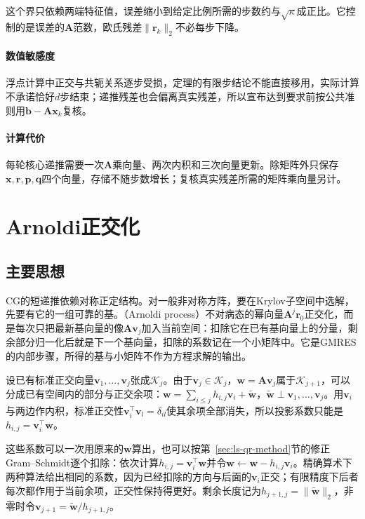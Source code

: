 这个界只依赖两端特征值，误差缩小到给定比例所需的步数约与$\sqrt\kappa$成正比。它控制的是误差的$\bm A$范数，欧氏残差$\lVert\bm r_k\rVert_2$不必每步下降。

\paragraph{数值敏感度}
浮点计算中正交与共轭关系逐步受损，定理的有限步结论不能直接移用，实际计算不承诺恰好$d$步结束；递推残差也会偏离真实残差，所以宣布达到要求前按公共准则用$\bm b-\bm A\bm x_k$复核。

\paragraph{计算代价}
每轮核心递推需要一次$\bm A$乘向量、两次内积和三次向量更新。除矩阵外只保存$\bm x,\bm r,\bm p,\bm q$四个向量，存储不随步数增长；复核真实残差所需的矩阵乘向量另计。

\section{Arnoldi正交化}
\label{sec:ls-arnoldi}

\subsection{主要思想}

CG的短递推依赖对称正定结构。对一般非对称方阵，要在Krylov子空间中选解，先要有它的一组可靠的基。（Arnoldi process）不对病态的幂向量$\bm A^j\bm r_0$正交化，而是每次只把最新基向量的像$\bm A\bm v_j$加入当前空间：扣除它在已有基向量上的分量，剩余部分归一化后就是下一个基向量，扣除的系数记在一个小矩阵中。它是GMRES的内部步骤，所得的基与小矩阵不作为方程求解的输出。

设已有标准正交向量$\bm v_1,\ldots,\bm v_j$张成$\mathcal K_j$。由于$\bm v_j\in\mathcal K_j$，$\bm w=\bm A\bm v_j$属于$\mathcal K_{j+1}$，可以分成已有空间内的部分与正交余项：$\bm w=\sum_{i\le j}h_{i,j}\bm v_i+\tilde{\bm w}$，$\tilde{\bm w}\perp\bm v_1,\ldots,\bm v_j$。用$\bm v_i$与两边作内积，标准正交性$\bm v_i^\top\bm v_l=\delta_{il}$使其余项全部消失，所以投影系数只能是$h_{i,j}=\bm v_i^\top\bm w$。

这些系数可以一次用原来的$\bm w$算出，也可以按第~\ref{sec:ls-qr-method}节的修正Gram--Schmidt逐个扣除：依次计算$h_{i,j}=\bm v_i^\top\bm w$并令$\bm w\leftarrow\bm w-h_{i,j}\bm v_i$。精确算术下两种算法给出相同的系数，因为已经扣除的方向与后面的$\bm v_i$正交；有限精度下后者每次都作用于当前余项，正交性保持得更好。剩余长度记为$h_{j+1,j}=\lVert\tilde{\bm w}\rVert_2$，非零时令$\bm v_{j+1}=\tilde{\bm w}/h_{j+1,j}$。

